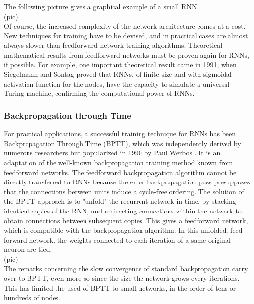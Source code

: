 \documentclass[12pt,oneside]{CUNY_CS_PhD}
\begin{document}
 The following picture gives a graphical example of a small RNN.\\
(pic)\\
Of course, the increased complexity of the network architecture comes at a cost. New techniques for training have to be devised, and in practical cases are almost always slower than feedforward network training algorithms. Theoretical mathematical results from feedforward networks must be proven again for RNNs, if possible. For example, one important theoretical result came in 1991, when Siegelmann and Sontag \cite{Siegelmann91turingcomputability} proved that RNNs, of finite size and with sigmoidal activation function for the nodes, have the capacity to simulate a universal Turing machine, confirming the computational power of RNNs.

\subsubsection{Backpropagation through Time}
For practical applications, a successful training technique for RNNs has been Backpropagation Through Time (BPTT), which was independently derived by numerous researchers but popularized in 1990 by Paul Werbos \cite{werbos_backpropagation_1990}. It is an adaptation of the well-known backpropagation training method known from feedforward networks. The feedforward backpropagation algorithm cannot be directly transferred to RNNs because the error backpropagation pass presupposes that the connections between units induce a cycle-free ordering. The solution of the BPTT approach is to "unfold" the recurrent network in time, by stacking identical copies of the RNN, and redirecting connections within the network to obtain connections between subsequent copies. This gives a feedforward network, which is compatible with the backpropagation algorithm. In this unfolded, feed-forward network, the weights connected to each iteration of a same original neuron are tied.\\
(pic)\\
The remarks concerning the slow convergence of standard backpropagation carry over to BPTT, even more so since the size the network grows every iterations. This has limited the used of BPTT to small networks, in the order of tens or hundreds of nodes.
\end{document}

